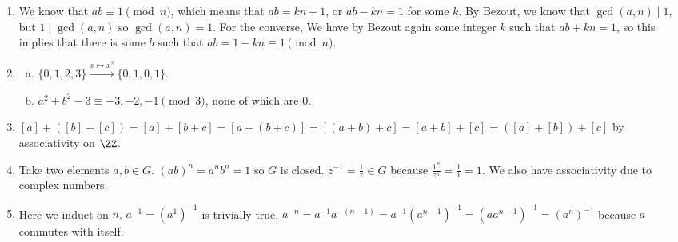\documentclass{article}
\begin{document}
\begin{enumerate}

\item We know that $ab \equiv 1 \pmod{n}$, which means that $ab = kn +
1$, or $ab - kn = 1$ for some $k$. By Bezout, we know that $\gcd(a, n)
\mid 1$, but $1 \mid \gcd(a, n)$ so $\gcd(a, n) = 1$. For the converse,
We have by Bezout again some integer $k$ such that $ab + kn = 1$, so
this implies that there is some $b$ such that $ab = 1 - kn \equiv 1
\pmod{n}$.

\item
\begin{enumerate}[(a)]
\item $\lbrace 0, 1, 2, 3 \rbrace \xrightarrow{x \mapsto x^2} \lbrace 0,
1, 0, 1 \rbrace$.
\item $a^2 + b^2 - 3 \equiv -3, -2, -1 \pmod{3}$, none of which are $0$.
\end{enumerate}

\item $[a] + ([b] + [c]) = [a] + [b + c] = [a + (b + c)] = [(a + b) + c]
= [a + b] + [c] = ([a] + [b]) + [c]$ by associativity on $\ZZ$.

\item Take two elements $a, b \in G$. $(ab)^n = a^n b^n = 1$ so $G$ is
closed. $z^{-1} = \frac{1}{z} \in G$ because $\frac{1^n}{z^n} =
\frac{1}{1} = 1$. We also have associativity due to complex numbers.

\item Here we induct on $n$. $a^{-1} = \left(a^1\right)^{-1}$ is
trivially true. $a^{-n} = a^{-1} a^{-(n - 1)} = a^{-1} \left(a^{n -
1}\right)^{-1} = \left(a a^{n - 1}\right)^{-1} = \left(a^n\right)^{-1}$
because $a$ commutes with itself.

\end{enumerate}
\end{document}
